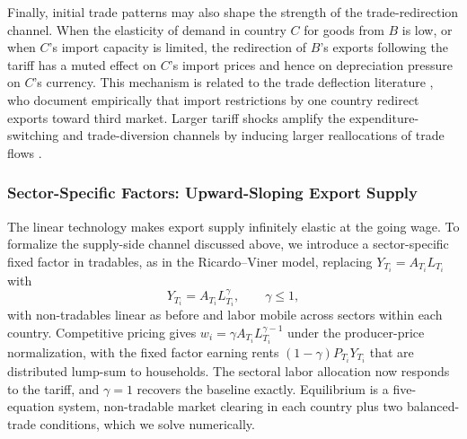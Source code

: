 \documentclass[11pt]{article}
\theoremstyle{plain}
\theoremstyle{remark}
\numberwithin{lemma}{section}
\numberwithin{proposition}{section}
\numberwithin{corollary}{section}
\newenvironment{revblock}{\par\begingroup\color{RevBlue}}{\endgroup\par}
\begin{document}
Finally, initial trade patterns may also shape the strength of the trade-redirection channel. When the elasticity of demand in country $C$ for goods from $B$ is low, or when $C$'s import capacity is limited, the redirection of $B$'s exports following the tariff has a muted effect on $C$'s import prices and hence on depreciation pressure on $C$'s currency. This mechanism is related to the trade deflection literature \citep{bown2007}, who document empirically that import restrictions by one country redirect exports toward third market. Larger tariff shocks amplify the expenditure-switching and trade-diversion channels by inducing larger reallocations of trade flows \citep{amiti2019}.

\begin{revblock}
\subsubsection{Sector-Specific Factors: Upward-Sloping Export Supply}
\label{sec:rv}

The linear technology makes export supply infinitely elastic at the going wage. To formalize the supply-side channel discussed above, we introduce a sector-specific fixed factor in tradables, as in the Ricardo--Viner model, replacing $Y_{T_i} = A_{T_i} L_{T_i}$ with
\[
Y_{T_i} = A_{T_i} L_{T_i}^{\gamma}, \qquad \gamma \le 1,
\]
with non-tradables linear as before and labor mobile across sectors within each country. Competitive pricing gives $w_i = \gamma A_{T_i} L_{T_i}^{\gamma-1}$ under the producer-price normalization, with the fixed factor earning rents $(1-\gamma) P_{T_i} Y_{T_i}$ that are distributed lump-sum to households. The sectoral labor allocation now responds to the tariff, and $\gamma = 1$ recovers the baseline exactly. Equilibrium is a five-equation system, non-tradable market clearing in each country plus two balanced-trade conditions, which we solve numerically.


\end{revblock}
\end{document}
